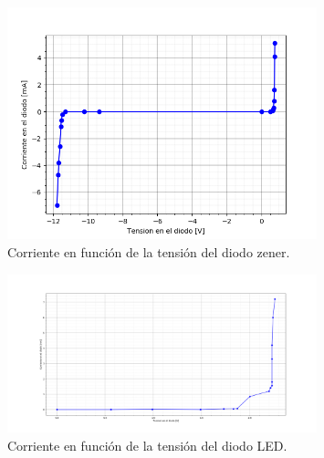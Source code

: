 \documentclass[a4paper]{article}
\begin{document}
\begin{figure}[H]
	\centering
	\includegraphics[width=0.8\textwidth,natwidth=610,natheight=642]{CurvaZenerEntera.png}
	\caption{Corriente en función de la tensión del diodo zener.}
	\label{fig:diodozen}
\end{figure}

\begin{figure}[H]
	\centering
	\includegraphics[width=0.8\textwidth,natwidth=610,natheight=642]{CurvaDiodosLed.png}
	\caption{Corriente en función de la tensión del diodo LED.}
	\label{fig:diodoled}
\end{figure}



%
%	
%
%
%
%	
%	
\end{document}
